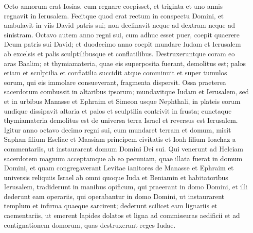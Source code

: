 \begin{biblechapter}
\begin{biblechapter}
\begin{biblechapter}
\begin{biblechapter}
\begin{biblechapter}
\begin{biblechapter}
\begin{biblechapter}
\begin{biblechapter}
\begin{biblechapter}
\begin{biblechapter}
\begin{biblechapter}
\begin{biblechapter}
\begin{biblechapter}
\begin{biblechapter}
\begin{biblechapter}
\begin{biblechapter}
\begin{biblechapter}
\begin{biblechapter}
\begin{biblechapter}
\begin{biblechapter}
\begin{biblechapter}
\begin{biblechapter}
\begin{biblechapter}
\begin{biblechapter}
\begin{biblechapter}
\begin{biblechapter}
\begin{biblechapter}
\begin{biblechapter}
\begin{biblechapter}
\begin{biblechapter}
\begin{biblechapter}
\begin{biblechapter}
\begin{biblechapter}
\begin{biblechapter}
\verse Octo annorum erat Iosias, cum regnare coepisset, et triginta et uno annis regnavit in Ierusalem. 
\verse Fecitque quod erat rectum in conspectu Domini, et ambulavit in viis David patris sui; non declinavit neque ad dextram neque ad sinistram.
 \verse Octavo autem anno regni sui, cum adhuc esset puer, coepit quaerere Deum patris sui David; et duodecimo anno coepit mundare Iudam et Ierusalem ab excelsis et palis sculptilibusque et conflatilibus. 
\verse Destruxeruntque coram eo aras Baalim; et thymiamateria, quae eis superposita fuerant, demolitus est; palos etiam et sculptilia et conflatilia succidit atque comminuit et super tumulos eorum, qui eis immolare consueverant, fragmenta dispersit. 
\verse Ossa praeterea sacerdotum combussit in altaribus ipsorum; mundavitque Iudam et Ierusalem, 
\verse sed et in urbibus Manasse et Ephraim et Simeon usque Nephthali, in plateis eorum undique 
\verse dissipavit altaria et palos et sculptilia contrivit in frusta; cunctaque thymiamateria demolitus est de universa terra Israel et reversus est Ierusalem.
 \verse Igitur anno octavo decimo regni sui, cum mundaret terram et domum, misit Saphan filium Eseliae et Maasiam principem civitatis et Ioah filium Ioachaz a commentariis, ut instaurarent domum Domini Dei sui. 
\verse Qui venerunt ad Helciam sacerdotem magnum acceptamque ab eo pecuniam, quae illata fuerat in domum Domini, et quam congregaverant Levitae ianitores de Manasse et Ephraim et universis reliquiis Israel ab omni quoque Iuda et Beniamin et habitatoribus Ierusalem, 
\verse tradiderunt in manibus opificum, qui praeerant in domo Domini, et illi dederunt eam operariis, qui operabantur in domo Domini, ut instaurarent templum et infirma quaeque sarcirent; 
\verse dederunt scilicet eam lignariis et caementariis, ut emerent lapides dolatos et ligna ad commissuras aedificii et ad contignationem domorum, quas destruxerant reges Iudae. 

\end{biblechapter}
\end{biblechapter}
\end{biblechapter}
\end{biblechapter}
\end{biblechapter}
\end{biblechapter}
\end{biblechapter}
\end{biblechapter}
\end{biblechapter}
\end{biblechapter}
\end{biblechapter}
\end{biblechapter}
\end{biblechapter}
\end{biblechapter}
\end{biblechapter}
\end{biblechapter}
\end{biblechapter}
\end{biblechapter}
\end{biblechapter}
\end{biblechapter}
\end{biblechapter}
\end{biblechapter}
\end{biblechapter}
\end{biblechapter}
\end{biblechapter}
\end{biblechapter}
\end{biblechapter}
\end{biblechapter}
\end{biblechapter}
\end{biblechapter}
\end{biblechapter}
\end{biblechapter}
\end{biblechapter}
\end{biblechapter}
